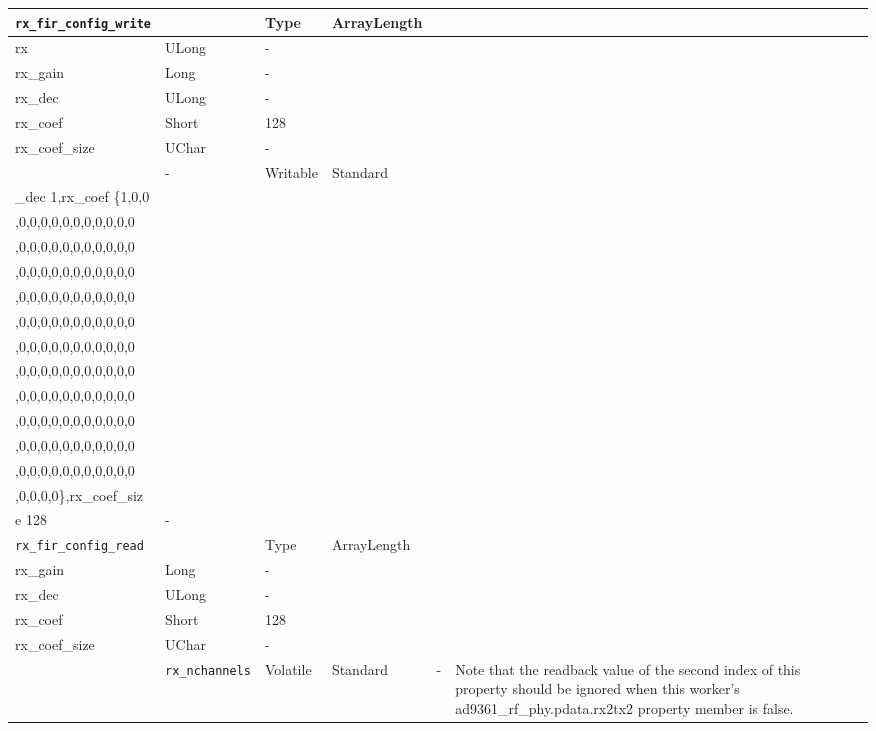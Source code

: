 \documentclass{article}
\begin{document}
\begin{landscape}
\begin{scriptsize}
\begin{longtable}{|p{3.6cm}|p{8.1cm}|p{1.4cm}|p{1.3cm}|p{1.4cm}|p{2.5cm}|p{3.6cm}|}
			\verb+rx_fir_config_write+ & \begin{tabular}{|p{2.2cm}|p{2.7cm}|p{2cm}|} \hline \cellcolor{blue} Name & \cellcolor{blue}Type & \cellcolor{blue} ArrayLength \\ \hline rx & ULong & - \\ \hline rx\_gain & Long & - \\ \hline rx\_dec & ULong & - \\ \hline rx\_coef & Short & 128 \\ \hline rx\_coef\_size & UChar & - \\ \hline\end{tabular} & - & Writable & Standard & \begin{tabular}{l}rx 0x83,rx\_gain 0,rx\\\_dec 1,rx\_coef \{1,0,0\\,0,0,0,0,0,0,0,0,0,0,0\\,0,0,0,0,0,0,0,0,0,0,0\\,0,0,0,0,0,0,0,0,0,0,0\\,0,0,0,0,0,0,0,0,0,0,0\\,0,0,0,0,0,0,0,0,0,0,0\\,0,0,0,0,0,0,0,0,0,0,0\\,0,0,0,0,0,0,0,0,0,0,0\\,0,0,0,0,0,0,0,0,0,0,0\\,0,0,0,0,0,0,0,0,0,0,0\\,0,0,0,0,0,0,0,0,0,0,0\\,0,0,0,0,0,0,0,0,0,0,0\\,0,0,0,0\},rx\_coef\_siz\\e 128\end{tabular} & - \\
			\hline
			\verb+rx_fir_config_read+ & \begin{tabular}{|p{2.2cm}|p{2.7cm}|p{2cm}|} \hline \cellcolor{blue} Name & \cellcolor{blue}Type & \cellcolor{blue} ArrayLength \\ \hline rx\_gain & Long & - \\ \hline rx\_dec & ULong & - \\ \hline rx\_coef & Short & 128 \\ \hline rx\_coef\_size & UChar & - \\ \hline \end{tabular} & \verb+rx_nchannels+ & Volatile & Standard & - & Note that the readback value of the second index of this property should be ignored when this worker's ad9361\_rf\_phy.pdata.rx2tx2 property member is false. \\

\end{longtable}
\end{scriptsize}
\end{landscape}
\end{document}
